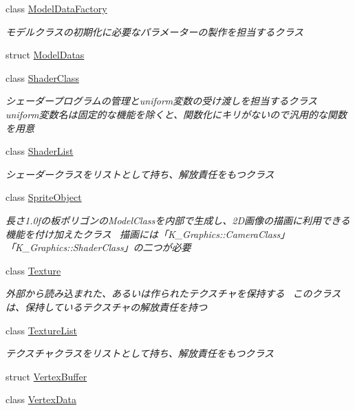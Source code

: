 \begin{DoxyCompactItemize}
class \mbox{\hyperlink{class_k___graphics_1_1_model_data_factory}{Model\+Data\+Factory}}
\begin{DoxyCompactList}\small\item\em モデルクラスの初期化に必要なパラメーターの製作を担当するクラス \end{DoxyCompactList}\item 
struct \mbox{\hyperlink{struct_k___graphics_1_1_model_datas}{Model\+Datas}}
\item 
class \mbox{\hyperlink{class_k___graphics_1_1_shader_class}{Shader\+Class}}
\begin{DoxyCompactList}\small\item\em シェーダープログラムの管理とuniform変数の受け渡しを担当するクラス uniform変数名は固定的な機能を除くと、関数化にキリがないので汎用的な関数を用意 \end{DoxyCompactList}\item 
class \mbox{\hyperlink{class_k___graphics_1_1_shader_list}{Shader\+List}}
\begin{DoxyCompactList}\small\item\em シェーダークラスをリストとして持ち、解放責任をもつクラス \end{DoxyCompactList}\item 
class \mbox{\hyperlink{class_k___graphics_1_1_sprite_object}{Sprite\+Object}}
\begin{DoxyCompactList}\small\item\em 長さ1.0fの板ポリゴンの\+Model\+Classを内部で生成し、2\+D画像の描画に利用できる機能を付け加えたクラス~\newline
描画には「\+K\+\_\+\+Graphics\+::\+Camera\+Class」「\+K\+\_\+\+Graphics\+::\+Shader\+Class」の二つが必要 \end{DoxyCompactList}\item 
class \mbox{\hyperlink{class_k___graphics_1_1_texture}{Texture}}
\begin{DoxyCompactList}\small\item\em 外部から読み込まれた、あるいは作られたテクスチャを保持する~\newline
このクラスは、保持しているテクスチャの解放責任を持つ \end{DoxyCompactList}\item 
class \mbox{\hyperlink{class_k___graphics_1_1_texture_list}{Texture\+List}}
\begin{DoxyCompactList}\small\item\em テクスチャクラスをリストとして持ち、解放責任をもつクラス \end{DoxyCompactList}\item 
struct \mbox{\hyperlink{struct_k___graphics_1_1_vertex_buffer}{Vertex\+Buffer}}
\item 
class \mbox{\hyperlink{class_k___graphics_1_1_vertex_data}{Vertex\+Data}}
\end{DoxyCompactItemize}
